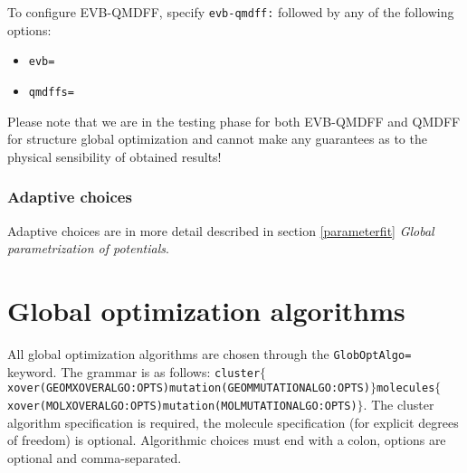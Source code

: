 \documentclass[a4paper,10pt]{scrbook}
\begin{document}
To configure EVB-QMDFF, specify \texttt{evb-qmdff:} followed by any of the following options:
\begin{itemize}
 \item \texttt{evb=}
 \item \texttt{qmdffs=}
\end{itemize}

Please note that we are in the testing phase for both EVB-QMDFF and QMDFF for structure global optimization and cannot make any guarantees as to the physical sensibility of obtained results!

\subsubsection{Adaptive choices}
Adaptive choices are in more detail described in section \ref{parameterfit}
\emph{Global parametrization of potentials}.

\section{Global optimization algorithms}
\label{sec:geomglobopt}
All global optimization algorithms are chosen through the \texttt{GlobOptAlgo=}
keyword. The grammar is as follows: 
\texttt{cluster$\{$xover(GEOMXOVERALGO:OPTS)mutation(GEOMMUTATIONALGO:OPTS)$\}
$molecules$\{$ xover(MOLXOVERALGO:OPTS)mutation(MOLMUTATIONALGO:OPTS)$\}$}.
The cluster algorithm specification is required, the molecule specification 
(for explicit degrees of freedom) is optional. Algorithmic choices must end 
with a colon, options are optional and comma-separated.
\end{document}
